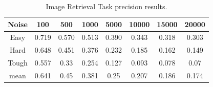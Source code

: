 \documentclass[10pt,twocolumn,letterpaper]{article}
\begin{document}
\begin{table}[h]
\centering
\begin{tabular}{| c | c | c | c | c | c | c | c |}
\hline
Noise & 100      & 500      & 1000     & 5000     & 10000     & 15000     & 20000     \\
\hline
Easy  & 0.719 & 0.570 & 0.513 & 0.390 & 0.343 & 0.318 & 0.303 \\
Hard  & 0.648 & 0.451 & 0.376 & 0.232 & 0.185 & 0.162 & 0.149 \\
Tough & 0.557 & 0.33  & 0.254 & 0.127 & 0.093 & 0.078 & 0.07  \\
mean  & 0.641 & 0.45  & 0.381 & 0.25  & 0.207 & 0.186 & 0.174 \\
\hline
\end{tabular}
\caption{Image Retrieval Task precision results.}
\label{tab:baseline_retrieval}
\end{table}
\end{document}
